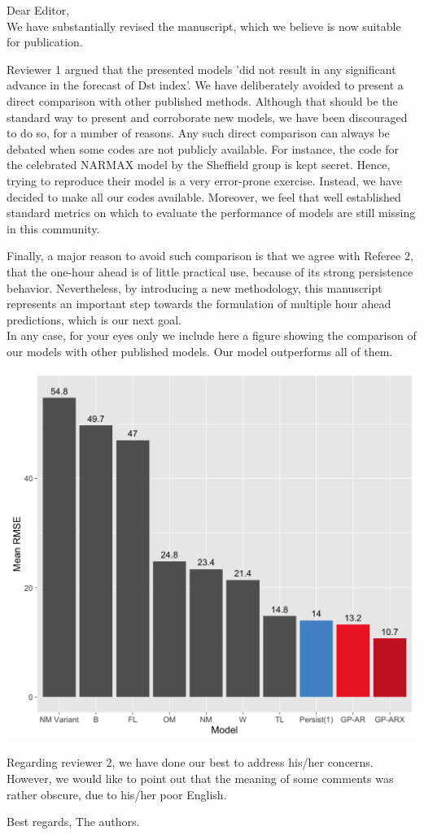 \documentclass{letter}
\begin{document}
Dear Editor,\\

We have substantially revised the manuscript, which we believe is now suitable for publication.

Reviewer 1 argued that the presented models 'did not result in any significant advance in the forecast of Dst index'. We have deliberately avoided to present a direct comparison with other published methods. Although that should be the standard way to present and corroborate new models, we have been discouraged to do so, for a number of reasons. Any such direct comparison can always be debated when some codes are not publicly available. For instance, the code for the celebrated NARMAX model by the Sheffield group is kept secret. Hence, trying to reproduce their model is a very error-prone exercise. Instead, we have decided to make all our codes available. Moreover, we feel that well established standard metrics on which to evaluate the performance of models are still missing in this community.

Finally, a major reason to avoid such comparison is that we agree with Referee 2, that the one-hour ahead is of little practical use, because of its strong persistence behavior. Nevertheless, by introducing a new methodology, this manuscript represents an important step towards the formulation of multiple hour ahead predictions, which is our next goal.\\

In any case, for your eyes only we include here a figure showing the comparison of our models with other published models. Our model outperforms all of them.

\includegraphics[width=\textwidth]{figures/Compare_RMSE.png}

Regarding reviewer 2, we have done our best to address his/her concerns. However, we would like to point out that the meaning of some comments was rather obscure, due to his/her poor English.

Best regards,
The authors.

\hfill
\end{document}
